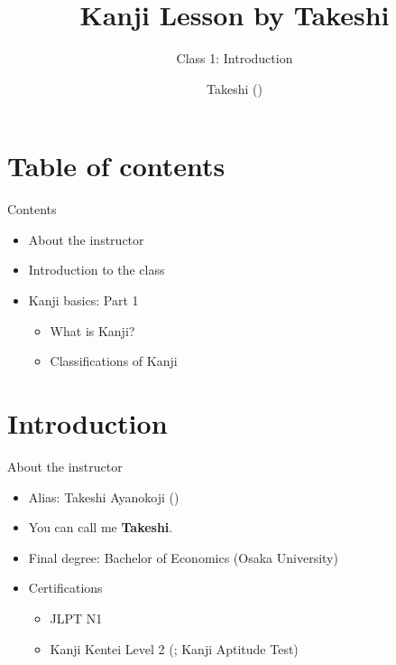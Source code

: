 \documentclass[12pt,aspectratio=169]{beamer}
\newenvironment{items}
	{\begin{itemize}
		\setlength\itemsep{5pt}
	}{\end{itemize}}
\begin{document}
	\author{Takeshi ()}
	\title{Kanji Lesson by Takeshi}
	\subtitle{Class 1: Introduction}
	\date{}
	\begin{frame}[plain]
		\maketitle
	\end{frame}

	\section{Table of contents}
	
	\begin{frame}{Contents}
		\begin{items}
			\item About the instructor
			\item Introduction to the class
			\item Kanji basics: Part 1
			\begin{items}
				\item What is Kanji?
				\item Classifications of Kanji
			\end{items}
		\end{items}
	\end{frame}

	\section{Introduction}

	\begin{frame}{About the instructor}
		\begin{items}
			\item Alias: Takeshi Ayanokoji ()
			\item You can call me \textbf{Takeshi}.
			\item Final degree: Bachelor of Economics (Osaka University)
			\item Certifications
			\begin{items}
				\item JLPT N1
				\item Kanji Kentei Level 2 (; Kanji Aptitude Test)
			\end{items}
		\end{items}
	\end{frame}
\end{document}
